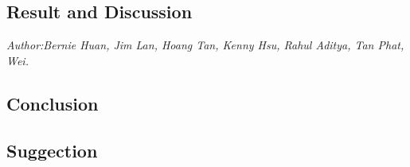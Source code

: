 
\subsection*{Result and Discussion}
\textit{\footnotesize Author:Bernie Huan, Jim Lan, Hoang Tan, Kenny Hsu, Rahul Aditya, Tan Phat, Wei.}\\




\subsection*{Conclusion}

\subsection*{Suggection}
